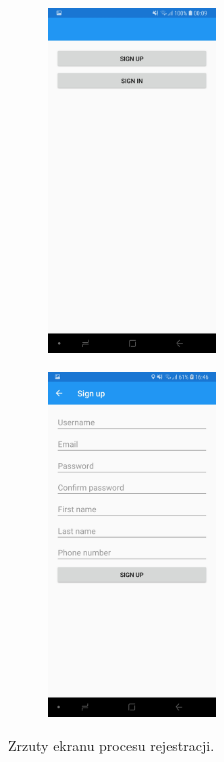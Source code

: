\begin{figure}[!ht]
	\begin{center}
		\begin{subfigure}[b]{0.3\textwidth}
				\includegraphics[width=1.75in]{img/mobile/ekran_startowy.jpg}
				\label{ekran_startowy_rejestracja}
		\end{subfigure}
		\begin{subfigure}[b]{0.3\textwidth}
				\includegraphics[width=1.75in]{img/mobile/rejestracja.jpg}
				\label{rejestracja}
		\end{subfigure}
	\end{center}
	\caption{Zrzuty ekranu procesu rejestracji.}
\end{figure}

